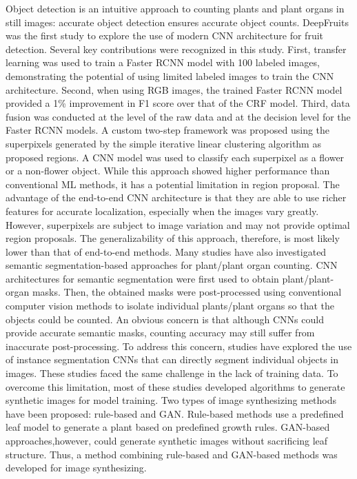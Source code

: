 Object detection is an intuitive approach to counting plants and plant organs in still images: accurate object detection ensures accurate object counts.
DeepFruits was the first study to explore the use of modern CNN architecture for fruit detection. Several key contributions were recognized in this study.
First, transfer learning was used to train a Faster RCNN\cite{ren2015faster} model with 100 labeled images, demonstrating the potential of using limited labeled images to train the CNN
architecture. Second, when using RGB images, the trained Faster RCNN model provided a 1\% improvement in F1 score over that of the CRF model. Third, data fusion was
conducted at the level of the raw data and at the decision level for the Faster RCNN models. A custom two-step framework was proposed using the superpixels generated
by the simple iterative linear clustering algorithm as proposed regions. A CNN model was used to classify each superpixel as a flower or a non-flower object. While
this approach showed higher performance than conventional ML methods, it has a potential limitation in region proposal. The advantage of the end-to-end CNN architecture
is that they are able to use richer features for accurate localization, especially when the images vary greatly. However, superpixels are subject to image variation and
may not provide optimal region proposals. The generalizability of this approach, therefore, is most likely lower than that of end-to-end methods.
Many studies have also investigated semantic segmentation-based approaches for plant/plant organ counting. CNN architectures for semantic segmentation were first used to
obtain plant/plant-organ masks. Then, the obtained masks were post-processed using conventional computer vision methods to isolate individual plants/plant organs so that
the objects could be counted. An obvious concern is that although CNNs could provide accurate semantic masks, counting accuracy may still suffer from inaccurate
post-processing. To address this concern, studies have explored the use of instance segmentation CNNs that can directly segment individual objects in images. These
studies faced the same challenge in the lack of training data. To overcome this limitation, most of these studies developed algorithms to generate synthetic images for
model training. Two types of image synthesizing methods have been proposed: rule-based and GAN\cite{goodfellow2014generative}. Rule-based methods use a predefined leaf model to generate a plant based
on predefined growth rules. GAN-based approaches,however, could generate synthetic images without sacrificing leaf structure. Thus, a method combining rule-based and
GAN-based methods was developed for image synthesizing.



